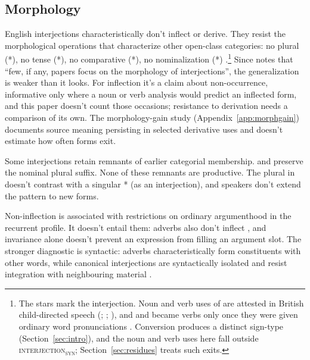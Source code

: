 \documentclass[12pt]{article}
\newcommand{\intj}[1]{\textsc{interjection\textsubscript{#1}}}
\begin{document}
\subsection{Morphology}

English interjections characteristically don't inflect or derive. They
resist the morphological operations that characterize other open-class
categories: no plural (*), no tense (*),
no comparative (*), no nominalization
(*) \citep[106]{ameka1992}.\footnote{The stars mark the
interjection. Noun and verb uses of  are attested in British
child-directed speech (; ; \citealp[36]{stange2016}), and
 and
 became verbs only once they were given ordinary word
pronunciations \citep[147]{wilkins1992}. Conversion produces a distinct
sign-type (Section~\ref{sec:intro}), and the noun and verb uses here fall
outside \intj{syn}; Section~\ref{sec:residues} treats such exits.} Since
\textcite{libert2019} notes that \enquote{few, if any, papers focus on
the morphology of interjections}, the generalization is weaker than it
looks. For inflection it's a claim about non-occurrence, informative only
where a noun or verb analysis would predict an inflected form, and this paper
doesn't count those occasions; resistance to derivation needs a comparison of
its own. The morphology-gain study (Appendix~\ref{app:morphgain}) documents
source meaning persisting in selected derivative uses and doesn't estimate
how often forms exit.

Some interjections retain remnants of earlier categorial membership.
 and  preserve the nominal plural
suffix. None of these remnants are productive. The plural in
 doesn't contrast with a singular * (as
an interjection), and speakers don't extend the pattern to new forms.

Non-inflection is associated with restrictions on ordinary argumenthood in
the recurrent profile. It doesn't entail them: adverbs also don't inflect
\citep[106]{ameka1992}, and invariance alone doesn't prevent an expression
from filling an argument slot. The stronger diagnostic is syntactic:
adverbs characteristically form constituents with other words, while
canonical interjections are syntactically isolated and resist integration
with neighbouring material \citep[152--153, 164]{meinard2015}.
\end{document}
